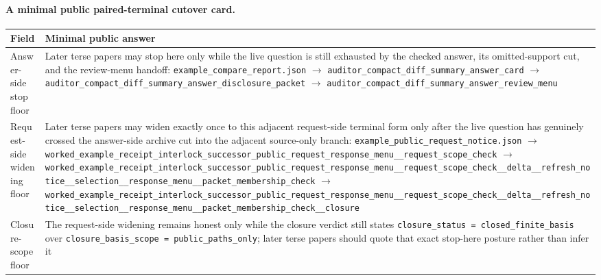 \documentclass[11pt]{article}
\begin{document}
\paragraph{A minimal public paired-terminal cutover card.}
\begin{table}[t]
\centering
\small
\begin{tabularx}{\linewidth}{@{}LY@{}}
\toprule
Field & Minimal public answer \\
\midrule
Answer-side stop floor & Later terse papers may stop here only while the live question is still exhausted by the checked answer, its omitted-support cut, and the review-menu handoff:\newline
\texttt{\nolinkurl{example_compare_report.json}}\newline
$\to$\newline
\texttt{\nolinkurl{auditor_compact_diff_summary_answer_card}}\newline
$\to$\newline
\texttt{\nolinkurl{auditor_compact_diff_summary_answer_disclosure_packet}}\newline
$\to$\newline
\texttt{\nolinkurl{auditor_compact_diff_summary_answer_review_menu}} \\
Request-side widening floor & Later terse papers may widen exactly once to this adjacent request-side terminal form only after the live question has genuinely crossed the answer-side archive cut into the adjacent source-only branch:\newline
\texttt{\nolinkurl{example_public_request_notice.json}}\newline
$\to$\newline
\texttt{\nolinkurl{worked_example_receipt_interlock_successor_public_request_response_menu__request_scope_check}}\newline
$\to$\newline
\texttt{\nolinkurl{worked_example_receipt_interlock_successor_public_request_response_menu__request_scope_check__delta__refresh_notice__selection__response_menu__packet_membership_check}}\newline
$\to$\newline
\texttt{\nolinkurl{worked_example_receipt_interlock_successor_public_request_response_menu__request_scope_check__delta__refresh_notice__selection__response_menu__packet_membership_check__closure}} \\
Closure-scope floor & The request-side widening remains honest only while the closure verdict still states \nolinkurl{closure_status = closed_finite_basis} over \nolinkurl{closure_basis_scope = public_paths_only}; later terse papers should quote that exact stop-here posture rather than infer it \\

\end{tabularx}
\end{table}
\end{document}
